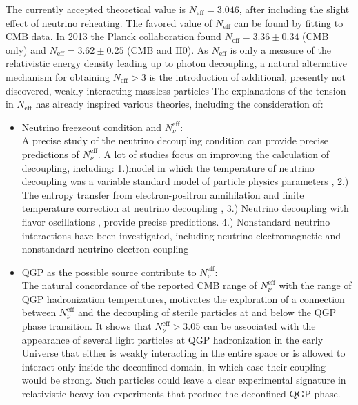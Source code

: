 \documentclass[universe,article,submit,moreauthors,pdftex,a4paper]{Definitions/mdpi}
\begin{document}
The currently accepted theoretical value is $N_\mathrm{eff}=3.046$, after including the slight effect of neutrino reheating. The favored value of $N_\mathrm{eff}$ can be found by fitting to CMB data. In 2013 the Planck collaboration found $N_\mathrm{eff}=3.36\pm0.34$ (CMB only) and $N_\mathrm{eff}=3.62\pm0.25$ (CMB and H0). As $N_\mathrm{eff}$ is only a measure of the relativistic energy density leading up to photon decoupling, a natural alternative mechanism for obtaining $N_\mathrm{eff}>3$ is the introduction of additional, presently not
discovered, weakly interacting massless particles \cite{Abazajian:2012ys,Steigman:2013yua,Anchordoqui:2011nh,Anchordoqui:2012qu}
 The explanations of the tension in $N_\mathrm{eff}$ has already inspired various theories, including the consideration of:
\begin{itemize}
\item Neutrino freezeout condition and $N_\nu^{\mathrm{eff}}$:\\
A precise study of the neutrino decoupling condition can provide precise predictions of $N_\nu^{\mathrm{eff}}$. A lot of studies focus on improving the calculation of decoupling, including:
1.)model in which the temperature of neutrino decoupling was a variable standard model of particle physics parameters \cite{Birrell:2014uka}, 2.) The entropy transfer from electron-positron annihilation and finite temperature correction at neutrino decoupling \cite{Dicus:1982bz, Heckler:1994tv, Fornengo:1997wa}, 3.) Neutrino decoupling with flavor oscillations \cite{Mangano:2005cc,Mangano:2001iu}, provide precise predictions. 4.) Nonstandard neutrino interactions have been investigated, including neutrino electromagnetic \cite{Mangano:2006ar,Morgan:1981zy,Elmfors:1997tt,Fukugita:1987uy,Giunti:2008ve,Vogel:1989iv} and nonstandard neutrino electron coupling \cite{Mangano:2006ar}


\item QGP as the possible source contribute to $N_\nu^{\mathrm{eff}}$:\\
The natural concordance of the reported CMB range of $N_\nu^{\mathrm{eff}}$ with the range of QGP hadronization temperatures, motivates the exploration of a connection between $N_\nu^{\mathrm{eff}}$ and the decoupling of sterile particles at and below the QGP phase transition\cite{Birrell:2014cja}. It shows that $N_\nu^{\mathrm{eff}}>3.05$ can be associated with the appearance of several light particles at QGP hadronization in the early Universe that either is weakly interacting in the entire space or is allowed to interact only inside the deconfined domain, in which case their coupling would be strong. Such particles could leave a clear experimental signature in relativistic heavy ion experiments that produce the deconfined QGP phase.


\end{itemize}
\end{document}
